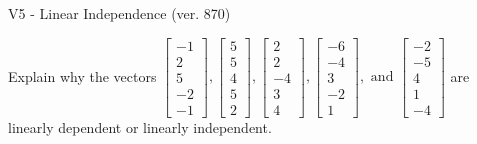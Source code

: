 \begin{exercise}
  \begin{exerciseTitle}V5 - Linear Independence (ver. 870)\end{exerciseTitle}
  \begin{exerciseStatement}
    Explain why the vectors \(\left[\begin{array}{r}
-1 \\
2 \\
5 \\
-2 \\
-1
\end{array}\right] , \left[\begin{array}{r}
5 \\
5 \\
4 \\
5 \\
2
\end{array}\right] , \left[\begin{array}{r}
2 \\
2 \\
-4 \\
3 \\
4
\end{array}\right] , \left[\begin{array}{r}
-6 \\
-4 \\
3 \\
-2 \\
1
\end{array}\right] , \text{ and } \left[\begin{array}{r}
-2 \\
-5 \\
4 \\
1 \\
-4
\end{array}\right]\) are linearly dependent or linearly independent.	



\end{exerciseStatement}
\end{exercise}
